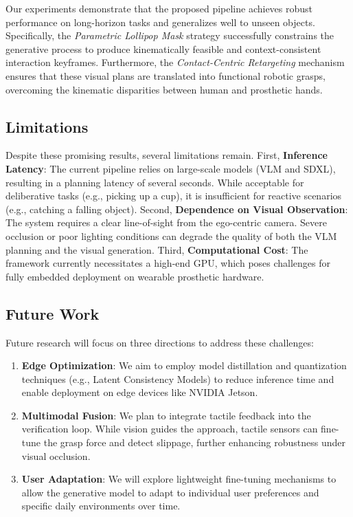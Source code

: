 \documentclass[letterpaper, 10 pt, conference]{ieeeconf}  %
\begin{document}
Our experiments demonstrate that the proposed pipeline achieves robust performance on long-horizon tasks and generalizes well to unseen objects. Specifically, the \emph{Parametric Lollipop Mask} strategy successfully constrains the generative process to produce kinematically feasible and context-consistent interaction keyframes. Furthermore, the \emph{Contact-Centric Retargeting} mechanism ensures that these visual plans are translated into functional robotic grasps, overcoming the kinematic disparities between human and prosthetic hands.

\subsection{Limitations}
Despite these promising results, several limitations remain. 
First, \textbf{Inference Latency}: The current pipeline relies on large-scale models (VLM and SDXL), resulting in a planning latency of several seconds. While acceptable for deliberative tasks (e.g., picking up a cup), it is insufficient for reactive scenarios (e.g., catching a falling object).
Second, \textbf{Dependence on Visual Observation}: The system requires a clear line-of-sight from the ego-centric camera. Severe occlusion or poor lighting conditions can degrade the quality of both the VLM planning and the visual generation.
Third, \textbf{Computational Cost}: The framework currently necessitates a high-end GPU, which poses challenges for fully embedded deployment on wearable prosthetic hardware.

\subsection{Future Work}
Future research will focus on three directions to address these challenges:
\begin{enumerate}
    \item \textbf{Edge Optimization}: We aim to employ model distillation and quantization techniques (e.g., Latent Consistency Models) to reduce inference time and enable deployment on edge devices like NVIDIA Jetson.
    \item \textbf{Multimodal Fusion}: We plan to integrate tactile feedback into the verification loop. While vision guides the approach, tactile sensors can fine-tune the grasp force and detect slippage, further enhancing robustness under visual occlusion.
    \item \textbf{User Adaptation}: We will explore lightweight fine-tuning mechanisms to allow the generative model to adapt to individual user preferences and specific daily environments over time.
\end{enumerate}
\end{document}
